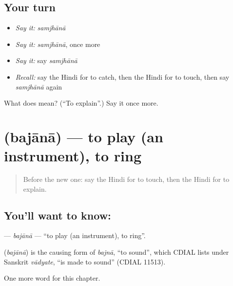 \subsection*{Your turn}
\begin{itemize}
\raggedright
  \item \emph{Say it:} \emph{samjhānā}
  \item \emph{Say it:} \emph{samjhānā}, once more
  \item \emph{Say it:} say \emph{samjhānā}
  \item \emph{Recall:} say the Hindi for to catch, then the Hindi for to touch, then say \emph{samjhānā} again
\end{itemize}

\begin{tcolorbox}[breakable,colback=teal!4,colframe=teal!35!black,title={Before you move on}]
What does  mean? (\textquotedblleft{}To explain\textquotedblright{}.) Say it once more.
\end{tcolorbox}
\section[\texorpdfstring{\hi{बजाना} (bajānā)}{बजाना (bajānā)}]{ (bajānā) — to play (an instrument), to ring}

\label{lesson:HI-C165-bajana}



\begin{quote}
Before the new one: say the Hindi for to touch, then the Hindi for to explain.
\end{quote}

\subsection*{You'll want to know: }
\textbf{} — \emph{bajānā} — \textquotedblleft{}to play (an instrument), to ring\textquotedblright{}.

\begin{cousinweb}
\textbf{} (\emph{bajānā}) is the causing form of \emph{bajnā}, \textquotedblleft{}to sound\textquotedblright{}, which CDIAL lists under Sanskrit \emph{vādyate}, \textquotedblleft{}is made to sound\textquotedblright{} (CDIAL 11513).
\end{cousinweb}

\begin{grammarlens}[title={What you've built}]
One more word for this chapter.
\end{grammarlens}


